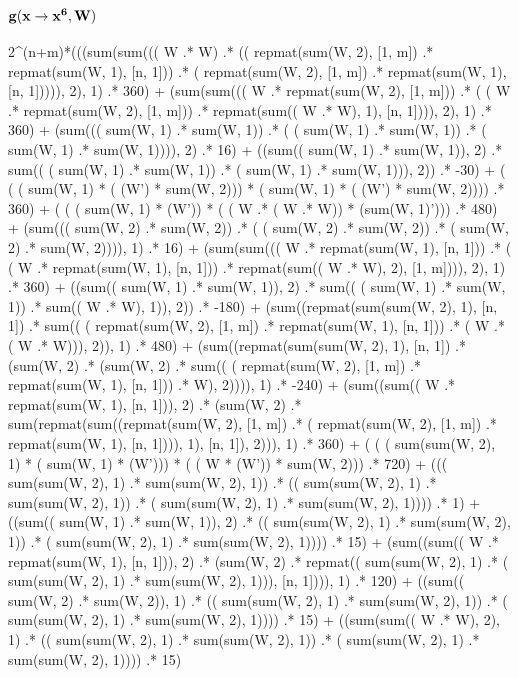 \documentclass[]{article}
\begin{document}
\subsection{{$\bf g(x \rightarrow x^6, W)$}}
2\^{}(n+m)*(((sum(sum((( W .* W)  .* (( repmat(sum(W, 2), [1, m]) .* repmat(sum(W, 1), [n, 1]))  .* ( repmat(sum(W, 2), [1, m]) .* repmat(sum(W, 1), [n, 1])))), 2), 1)  .* 360) 
  + (sum(sum((( W .* repmat(sum(W, 2), [1, m]))  .* ( ( W .* repmat(sum(W, 2), [1, m])) .* repmat(sum(( W .* W), 1), [n, 1]))), 2), 1)  .* 360) 
  + (sum((( sum(W, 1) .* sum(W, 1))  .* ( ( sum(W, 1) .* sum(W, 1)) .* ( sum(W, 1) .* sum(W, 1)))), 2)  .* 16) 
  + ((sum(( sum(W, 1) .* sum(W, 1)), 2)  .* sum(( ( sum(W, 1) .* sum(W, 1)) .* ( sum(W, 1) .* sum(W, 1))), 2))  .* -30) 
  + ( ( ( sum(W, 1) * ( (W') * sum(W, 2))) * ( sum(W, 1) * ( (W') * sum(W, 2)))) .* 360) 
  + ( ( ( sum(W, 1) * (W')) * ( ( W .* ( W .* W)) * (sum(W, 1)'))) .* 480) 
  + (sum((( sum(W, 2) .* sum(W, 2))  .* ( ( sum(W, 2) .* sum(W, 2)) .* ( sum(W, 2) .* sum(W, 2)))), 1)  .* 16) 
  + (sum(sum((( W .* repmat(sum(W, 1), [n, 1]))  .* ( ( W .* repmat(sum(W, 1), [n, 1])) .* repmat(sum(( W .* W), 2), [1, m]))), 2), 1)  .* 360) 
  + ((sum(( sum(W, 1) .* sum(W, 1)), 2)  .* sum(( ( sum(W, 1) .* sum(W, 1)) .* sum(( W .* W), 1)), 2))  .* -180) 
  + (sum((repmat(sum(sum(W, 2), 1), [n, 1])  .* sum(( ( repmat(sum(W, 2), [1, m]) .* repmat(sum(W, 1), [n, 1])) .* ( W .* ( W .* W))), 2)), 1)  .* 480) 
  + (sum((repmat(sum(sum(W, 2), 1), [n, 1])  .* (sum(W, 2)  .* (sum(W, 2)  .* sum(( ( repmat(sum(W, 2), [1, m]) .* repmat(sum(W, 1), [n, 1])) .* W), 2)))), 1)  .* -240) 
  + (sum((sum(( W .* repmat(sum(W, 1), [n, 1])), 2)  .* (sum(W, 2)  .* sum(repmat(sum((repmat(sum(W, 2), [1, m])  .* ( repmat(sum(W, 2), [1, m]) .* repmat(sum(W, 1), [n, 1]))), 1), [n, 1]), 2))), 1)  .* 360) 
  + ( ( ( sum(sum(W, 2), 1) * ( sum(W, 1) * (W'))) * ( ( W * (W')) * sum(W, 2))) .* 720) 
  + ((( sum(sum(W, 2), 1) .* sum(sum(W, 2), 1))  .* (( sum(sum(W, 2), 1) .* sum(sum(W, 2), 1))  .* ( sum(sum(W, 2), 1) .* sum(sum(W, 2), 1))))  .* 1) 
  + ((sum(( sum(W, 1) .* sum(W, 1)), 2)  .* (( sum(sum(W, 2), 1) .* sum(sum(W, 2), 1))  .* ( sum(sum(W, 2), 1) .* sum(sum(W, 2), 1))))  .* 15) 
  + (sum((sum(( W .* repmat(sum(W, 1), [n, 1])), 2)  .* (sum(W, 2)  .* repmat(( sum(sum(W, 2), 1) .* ( sum(sum(W, 2), 1) .* sum(sum(W, 2), 1))), [n, 1]))), 1)  .* 120) 
  + ((sum(( sum(W, 2) .* sum(W, 2)), 1)  .* (( sum(sum(W, 2), 1) .* sum(sum(W, 2), 1))  .* ( sum(sum(W, 2), 1) .* sum(sum(W, 2), 1))))  .* 15) 
  + ((sum(sum(( W .* W), 2), 1)  .* (( sum(sum(W, 2), 1) .* sum(sum(W, 2), 1))  .* ( sum(sum(W, 2), 1) .* sum(sum(W, 2), 1))))  .* 15) 
\end{document}
